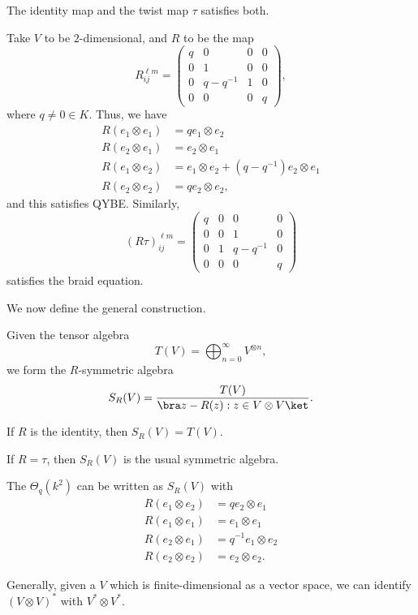 \documentclass[a4paper]{article}
\begin{document}
\begin{eg}
  The identity map and the twist map $\tau$ satisfies both.

  Take $V$ to be $2$-dimensional, and $R$ to be the map
  \[
    R_{ij}^{\ell m} =
    \begin{pmatrix}
      q & 0 & 0 & 0\\
      0 & 1 & 0 & 0\\
      0 & q - q^{-1} & 1 & 0\\
      0 & 0 & 0 & q
    \end{pmatrix},
  \]
  where $q \not= 0 \in K$. Thus, we have
  \begin{align*}
    R(e_1 \otimes e_1) &= q e_1 \otimes e_2\\
    R(e_2 \otimes e_1) &= e_2 \otimes e_1\\
    R(e_1 \otimes e_2) &= e_1 \otimes e_2 + (q - q^{-1}) e_2 \otimes e_1\\
    R(e_2 \otimes e_2) &= q e_2 \otimes e_2,
  \end{align*}
  and this satisfies QYBE. Similarly,
  \[
    (R \tau)^{\ell m}_{ij} =
    \begin{pmatrix}
      q & 0 & 0 & 0\\
      0 & 0 & 1 & 0\\
      0 & 1 & q - q^{-1} & 0\\
      0 & 0 & 0 & q
    \end{pmatrix}
  \]
  satisfies the braid equation.
\end{eg}
We now define the general construction.
\begin{defi}
  Given the tensor algebra
  \[
    T(V) = \bigoplus_{n = 0}^\infty V^{\otimes n},
  \]
  we form the $R$-symmetric algebra
  \[
    S_{R}(V) = \frac{T(V)}{\bra z - R(z): z \in V \otimes V\ket}.
  \]
\end{defi}
\begin{eg}
  If $R$ is the identity, then $S_R(V) = T(V)$.
\end{eg}
\begin{eg}
  If $R = \tau$, then $S_R(V)$ is the usual symmetric algebra.
\end{eg}

\begin{eg}
  The  $\Theta_q(k^2)$ can be written as $S_R(V)$ with
  \begin{align*}
    R(e_1 \otimes e_2) &= q e_2 \otimes e_1\\
    R(e_1 \otimes e_1) &= e_1 \otimes e_1\\
    R(e_2 \otimes e_1) &= q^{-1} e_1 \otimes e_2\\
    R(e_2 \otimes e_2) &= e_2 \otimes e_2.
  \end{align*}
\end{eg}
Generally, given a $V$ which is finite-dimensional as a vector space, we can identify $(V \otimes V)^*$ with $V^* \otimes V^*$.
\end{document}
